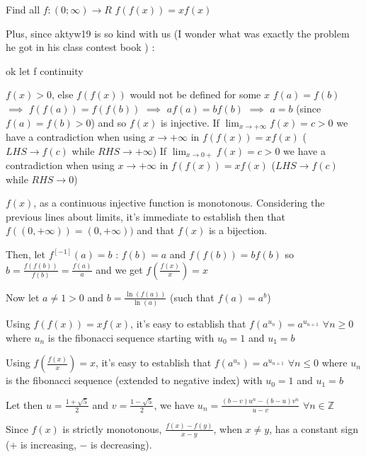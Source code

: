 \begin{solution}
	\begin{tcolorbox}Find all $ f: (0; \infty ) \rightarrow R$
$ f(f(x)) = x f(x)$\end{tcolorbox}

Plus, since aktyw19 is so kind with us (I wonder what was exactly the problem he got in his class \/ contest \/ book ) :

\begin{tcolorbox}ok let f continuity\end{tcolorbox}

$ f(x) > 0$, else $ f(f(x))$ would not be defined for some $ x$
$ f(a) = f(b)$ $ \implies$ $ f(f(a)) = f(f(b))$ $ \implies$ $ af(a) = bf(b)$ $ \implies$ $ a = b$ (since $ f(a) = f(b) > 0$) and so $ f(x)$ is injective.
If $ \lim_{x\to + \infty}f(x) = c > 0$ we have a contradiction when using $ x\to + \infty$ in $ f(f(x)) = xf(x)$ ($ LHS\to f(c)$ while $ RHS\to + \infty$)
If $ \lim_{x\to 0 + }f(x) = c > 0$ we have a contradiction when using $ x\to + \infty$ in $ f(f(x)) = xf(x)$ ($ LHS\to f(c)$ while $ RHS\to 0$)

$ f(x)$, as a continuous injective function is monotonous.
Considering the previous lines about limits, it's immediate to establish then that $ f((0, + \infty)) = (0, + \infty))$ and that $ f(x)$ is a bijection.

Then, let $ f^{[ - 1]}(a) = b$ : $ f(b) = a$ and $ f(f(b)) = bf(b)$ so $ b = \frac {f(f(b))}{f(b)} = \frac {f(a)}a$ and we get $ f(\frac {f(x)}x) = x$

Now let $ a\ne 1 > 0$ and $ b = \frac {\ln(f(a))}{\ln(a)}$ (such that $ f(a) = a^b$)

Using $ f(f(x)) = xf(x)$, it's easy to establish that $ f(a^{u_n}) = a^{u_{n + 1}}$ $ \forall n\ge 0$ where $ u_n$ is the fibonacci sequence starting with $ u_0 = 1$ and $ u_1 = b$

Using $ f(\frac {f(x)}x) = x$, it's easy to establish that $ f(a^{u_n}) = a^{u_{n + 1}}$ $ \forall n\le 0$ where $ u_n$ is the fibonacci sequence (extended to negative index) with $ u_0 = 1$ and $ u_1 = b$

Let then $ u = \frac {1 + \sqrt 5}2$ and $ v = \frac {1 - \sqrt 5}2$, we have $ u_n = \frac {(b - v)u^n - (b - u)v^n}{u - v}$ $ \forall n\in\mathbb Z$

Since $ f(x)$ is strictly monotonous, $ \frac {f(x) - f(y)}{x - y}$, when $ x\ne y$, has a constant sign ($ +$ is increasing, $ -$ is decreasing).


\end{solution}
